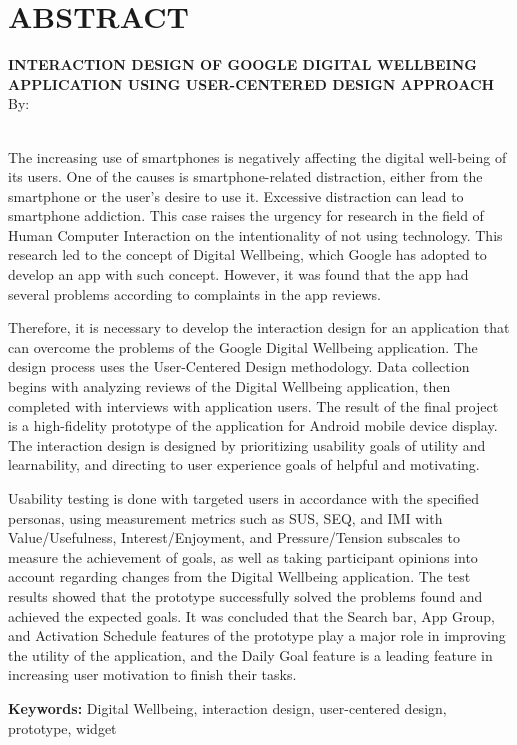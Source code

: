 \clearpage
\chapter*{ABSTRACT}

\begin{center}
  \textbf{\MakeUppercase{Interaction Design of Google Digital Wellbeing Application using User-Centered Design Approach}} \\[1em]
  
  By: \\
  \MakeUppercase{\theauthor} \\

\end{center}

\begin{singlespace}
  The increasing use of smartphones is negatively affecting the digital well-being of its users. One of the causes is smartphone-related distraction, either from the smartphone or the user's desire to use it. Excessive distraction can lead to smartphone addiction. This case raises the urgency for research in the field of Human Computer Interaction on the intentionality of not using technology. This research led to the concept of Digital Wellbeing, which Google has adopted to develop an app with such concept. However, it was found that the app had several problems according to complaints in the app reviews.

  Therefore, it is necessary to develop the interaction design for an application that can overcome the problems of the Google Digital Wellbeing application. The design process uses the User-Centered Design methodology. Data collection begins with analyzing reviews of the Digital Wellbeing application, then completed with interviews with application users. The result of the final project is a high-fidelity prototype of the application for Android mobile device display. The interaction design is designed by prioritizing usability goals of utility and learnability, and directing to user experience goals of helpful and motivating.

  Usability testing is done with targeted users in accordance with the specified personas, using measurement metrics such as SUS, SEQ, and IMI with Value/Usefulness, Interest/Enjoyment, and Pressure/Tension subscales to measure the achievement of goals, as well as taking participant opinions into account regarding changes from the Digital Wellbeing application. The test results showed that the prototype successfully solved the problems found and achieved the expected goals. It was concluded that the Search bar, App Group, and Activation Schedule features of the prototype play a major role in improving the utility of the application, and the Daily Goal feature is a leading feature in increasing user motivation to finish their tasks.

  \noindent \textbf{Keywords:} Digital Wellbeing, interaction design, user-centered design, prototype, widget

\end{singlespace}
